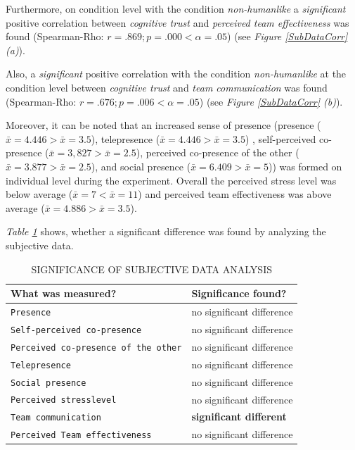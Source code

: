 \documentclass[sigchi]{acmart}
\begin{document}
Furthermore, on condition level with the condition \textit{non-humanlike} a \textit{significant} positive correlation between \textit{cognitive trust} and \textit{perceived team effectiveness} was found (Spearman-Rho: $r =.869; p =.000 < \alpha = .05$) (see \textit{Figure \ref{SubDataCorr} (a)}).

Also, a \textit{significant} positive correlation with the condition \textit{non-humanlike} at the condition level between \textit{cognitive trust} and \textit{team communication} was found (Spearman-Rho: $r =.676; p =.006 < \alpha = .05$) (see \textit{Figure \ref{SubDataCorr} (b)}).

Moreover, it can be noted that an increased sense of presence (presence ($\bar{x} = 4.446 > \bar{x} = 3.5$), telepresence ($\bar{x} = 4.446 > \bar{x} = 3.5$) , self-perceived co-presence ($\bar{x} = 3, 827 > \bar{x} = 2.5$), perceived co-presence of the other ($\bar{x} = 3.877 > \bar{x} = 2.5$), and social presence ($\bar{x} = 6.409 > \bar{x} = 5$)) was formed on individual level during the experiment. Overall the perceived stress level was below average ($\bar{x} = 7 < \bar{x} = 11$) and perceived team effectiveness was above average ($\bar{x} = 4.886 > \bar{x} = 3.5$).

\textit{Table \ref{SubDataSigs}} shows, whether a significant difference was found by analyzing the subjective data.

\begin{table}
	\caption{SIGNIFICANCE OF SUBJECTIVE DATA ANALYSIS}
  \label{SubDataSigs}
  \begin{tabular}{ll}
    \toprule
    What was measured? & Significance found? \\
    \midrule
     \texttt{Presence} & no significant difference \\
   	 \texttt{Self-perceived co-presence} & no significant difference \\
     \texttt{Perceived co-presence of the other} & no significant difference  \\
     \texttt{Telepresence} & no significant difference \\
     \texttt{Social presence} & no significant difference \\
     \texttt{Perceived stresslevel} & no significant difference \\
     \texttt{Team communication} & \textbf{significant different} \\
     \texttt{Perceived Team effectiveness} & no significant difference  \\
    \bottomrule
  \end{tabular}
\end{table}
\end{document}
